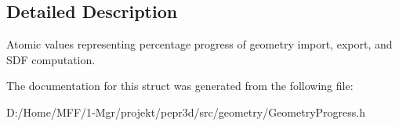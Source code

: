 \subsection{Detailed Description}
Atomic values representing percentage progress of geometry import, export, and S\+DF computation. 

The documentation for this struct was generated from the following file\+:\begin{DoxyCompactItemize}
\item 
D\+:/\+Home/\+M\+F\+F/1-\/\+Mgr/projekt/pepr3d/src/geometry/Geometry\+Progress.\+h\end{DoxyCompactItemize}
